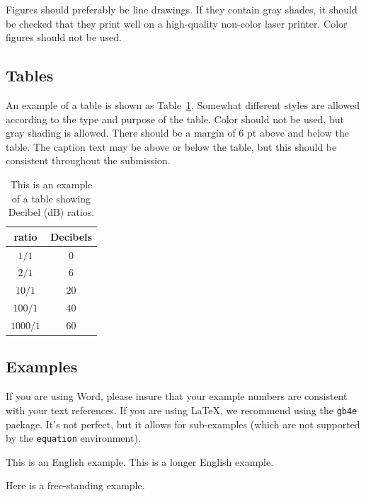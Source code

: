 \documentclass{tls}
\begin{document}
Figures should preferably be line drawings. If they contain gray shades, it should be checked that they print well on a high-quality non-color laser printer. Color figures should not be used.

\subsection{Tables}

An example of a table is shown as Table~\ref{tab:decibel}. Somewhat different styles are allowed according to the type and purpose of the table. Color should not be used, but gray shading is allowed. There should be a margin of 6 pt above and below the table. The caption text may be above or below the table, but this should be consistent throughout the submission.

\begin{table}[ht]
  \begin{center}
    \begin{tabular}{|c|c|}
      \hline
      \rowcolor[gray]{.75}
      \hline
      ratio    & Decibels \\
      \hline
      $1/1$    & $0$   \\
      $2/1$    & $6$   \\
      $10/1$   & $20$  \\
      $100/1$  & $40$  \\
      $1000/1$ & $60$  \\
      \hline
    \end{tabular}
  \end{center}
  \caption{This is an example of a table showing Decibel (dB) ratios.}
  \label{tab:decibel}
\end{table}

\subsection{Examples}

If you are using Word, please insure that your example numbers are consistent with your text references. If you are using \LaTeX, we recommend using the \texttt{gb4e} package. It's not perfect, but it allows for sub-examples (which are not supported by the \texttt{equation} environment).

\begin{exe}
  \ex\label{ex1}
    \begin{xlist}
      \ex\label{ex1a} This is an English example.
      \ex\label{ex1b} This is a longer English example.
    \end{xlist}
  \ex\label{ex2} Here is a free-standing example.
\end{exe}
\end{document}
